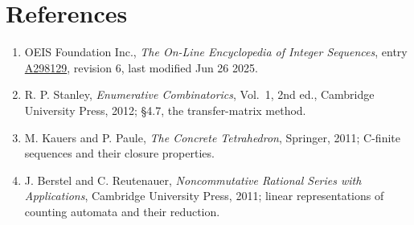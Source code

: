 \documentclass[11pt]{article}
\theoremstyle{definition}
\begin{document}
\section{References}

\begin{enumerate}

\item OEIS Foundation Inc., \emph{The On-Line Encyclopedia of Integer Sequences}, entry \href{https://oeis.org/A298129}{A298129}, revision 6, last modified Jun 26 2025.

\item R. P. Stanley, \emph{Enumerative Combinatorics}, Vol.~1, 2nd ed., Cambridge University Press, 2012; \S4.7, the transfer-matrix method.

\item M. Kauers and P. Paule, \emph{The Concrete Tetrahedron}, Springer, 2011; C-finite sequences and their closure properties.

\item J. Berstel and C. Reutenauer, \emph{Noncommutative Rational Series with Applications}, Cambridge University Press, 2011; linear representations of counting automata and their reduction.

\end{enumerate}
\end{document}
